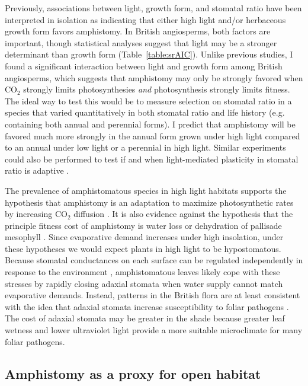\documentclass[12pt, oneside]{article}
\begin{document}
Previously, associations between light, growth form, and stomatal ratio have been interpreted in isolation as indicating that either high light and/or herbaceous growth form favors amphistomy. In British angiosperms, both factors are important, though statistical analyses suggest that light may be a stronger determinant than growth form (Table~\ref{table:srAIC}). Unlike previous studies, I found a significant interaction between light and growth form among British angiosperms, which suggests that amphistomy may only be strongly favored when CO$_2$ strongly limits photosynthesies \textit{and} photosynthesis strongly limits fitness. The ideal way to test this would be to measure selection on stomatal ratio in a species that varied quantitatively in both stomatal ratio and life history (e.g. containing both annual and perennial forms). I predict that amphistomy will be favored much more strongly in the annual form grown under high light compared to an annual under low light or a perennial in high light. Similar experiments could also be performed to test if and when light-mediated plasticity in stomatal ratio is adaptive \citep{Gay_Hurd_1975, Mott_Michaelson_1991}.

The prevalence of amphistomatous species in high light habitats supports the hypothesis that amphistomy is an adaptation to maximize photosynthetic rates by increasing CO$_2$ diffusion \citep{Jones_1985}. It is also evidence against the hypothesis that the principle fitness cost of amphistomy is water loss \citep{Darwin_1886, Foster_Smith_1986} or dehydration of pallisade mesophyll \citep{Buckley_etal_2015}. Since evaporative demand increases under high insolation, under these hypotheses we would expect plants in high light to be hypostomatous. Because stomatal conductances on each surface can be regulated independently in response to the environment \citep{Darwin_1898, Pospisilova_Solarova_1980, Smith_1981, Reich_1984, Mott_Oleary_1984}, amphistomatous leaves likely cope with these stresses by rapidly closing adaxial stomata when water supply cannot match evaporative demands. Instead, patterns in the British flora are at least consistent with the idea that adaxial stomata increase susceptibility to foliar pathogens \citep{Gutschick_1984b, Mckown_etal_2014}. The cost of adaxial stomata may be greater in the shade because greater leaf wetness and lower ultraviolet light provide a more suitable microclimate for many foliar pathogens.

\subsection*{Amphistomy as a proxy for open habitat}
\end{document}
